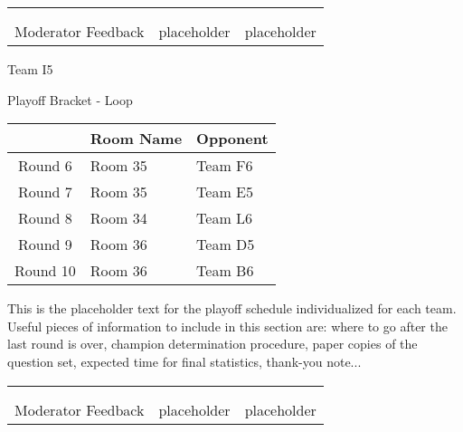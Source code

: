 \documentclass{article}%
\begin{document}
\newline%
%
\begin{tabularx}{\textwidth}{YYY}%
  &  &  \\%
\\%
Moderator Feedback&placeholder&placeholder\\%
\end{tabularx}%
\newpage%
\begin{center}%
\begin{Huge}%
Team I5%
\end{Huge}%
\vspace*{12pt}%
\linebreak%
\begin{Large}%
Playoff Bracket {-} Loop%
\end{Large}%
\end{center}%
\vspace*{4pt}%
%
\begin{tabularx}{\textwidth}{|c|Y|Y|}%
\hline%
&Room Name&Opponent\\%
\hline%
Round 6&Room 35&Team F6\\%
Round 7&Room 35&Team E5\\%
Round 8&Room 34&Team L6\\%
Round 9&Room 36&Team D5\\%
Round 10&Room 36&Team B6\\%
\hline%
\end{tabularx}%
\vspace*{30pt}%
\linebreak%
This is the placeholder text for the playoff schedule individualized for each team. Useful pieces of information to include in this section are: where to go after the last round is over, champion determination procedure, paper copies of the question set, expected time for final statistics, thank{-}you note...%
\vspace*{30pt}%
\newline%
%
\begin{tabularx}{\textwidth}{YYY}%
  &  &  \\%
\\%
Moderator Feedback&placeholder&placeholder\\%
\end{tabularx}%
\end{document}
